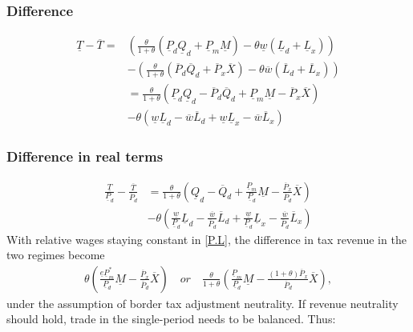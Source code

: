 \subsubsection*{Difference} 
\begin{equation}\label{t.diff}
\begin{aligned}
\underline T - \overline T = & \left( \frac{\theta}{1+\theta} \left(  \underline P_d \underline Q_d + \underline P_m \underline M \right )  - \theta \underline w  \left( \underline L_d + \underline L_x \right)  \right) \\ &-  \left( \frac{\theta}{1+\theta} \left( \overline P_d \overline Q_d  + \overline P_x \overline X  \right)  - \theta \overline w  \left( \overline L_d + \overline L_x \right)  \right)  \\
&= \frac{\theta}{1+\theta} \left( \underline P_d \underline Q_d - \overline P_d  \overline Q_d + \underline P_m \underline M - \overline P_x \overline X \right) \\ &- \theta \left( \underline w \underline L_d - \overline w \overline L_d + \underline w \underline L_x - \overline w \overline L_x \right) 
\end{aligned} 
\end{equation}

\subsubsection*{Difference in real terms}

\begin{equation}\label{t.real}
\begin{aligned}
    \frac{\underline T}{\underline P_d} - \frac{\overline T}{\overline P_d} &=  \frac{\theta}{1+\theta}  \left(  \underline Q_d - \overline Q_d +\frac{\underline P_m}{\underline P_d}\underline M - \frac{\overline P_x}{\overline P_d} \overline X \right) \\ &- \theta \left( \frac {\underline w}{\underline P_d} \underline L_d - \frac {\overline w}{\overline P_d} \overline L_d + \frac {\underline w}{\underline P_d} \underline L_x - \frac {\overline w}{\overline P_d} \overline L_x \right)
\end{aligned} 
\end{equation}
With relative wages staying constant in \eqref{P.L}, the difference in tax revenue in the two regimes become
\begin{equation}\label{t.real2}
\begin{aligned}    
    \theta  \left( \frac{\underline e \underline P^*_m}{\underline P_d} \underline M - \frac{\overline P_x}{\overline P_d}\overline X \right) \quad or \quad \frac{\theta}{1+\theta}  \left( \frac{\underline P_m}{\underline P_d} \underline M - \frac{ \left( 1+\theta \right) \overline P_x}{\overline P_d}\overline X \right),
\end{aligned} 
\end{equation}
under the assumption of border tax adjustment neutrality. 
If revenue neutrality should hold, trade in the single-period needs to be balanced. Thus:

